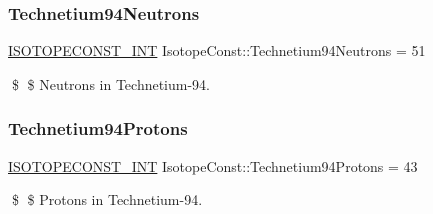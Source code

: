 \subsubsection{\texorpdfstring{Technetium94\+Neutrons}{Technetium94Neutrons}}
{\footnotesize\ttfamily \mbox{\hyperlink{group___isotope_const-_macros_ga5f18360b3e99483a35c32d789e62621c}{I\+S\+O\+T\+O\+P\+E\+C\+O\+N\+S\+T\+\_\+\+I\+NT}} Isotope\+Const\+::\+Technetium94\+Neutrons = 51}

\$ \$ Neutrons in Technetium-\/94. \mbox{\label{group___isotope_const-_technetium-_tc94_ga0bd83b1283ce721a7dd5d72ffa9dd307}} 
\subsubsection{\texorpdfstring{Technetium94\+Protons}{Technetium94Protons}}
{\footnotesize\ttfamily \mbox{\hyperlink{group___isotope_const-_macros_ga5f18360b3e99483a35c32d789e62621c}{I\+S\+O\+T\+O\+P\+E\+C\+O\+N\+S\+T\+\_\+\+I\+NT}} Isotope\+Const\+::\+Technetium94\+Protons = 43}

\$ \$ Protons in Technetium-\/94. 